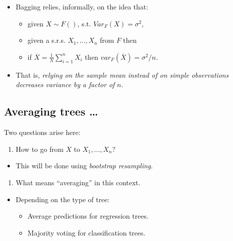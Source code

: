 \documentclass[
  letterpaper,
  DIV=11,
  numbers=noendperiod]{scrartcl}
\providecommand{\tightlist}{%
  \setlength{\itemsep}{0pt}\setlength{\parskip}{0pt}}\usepackage{longtable,booktabs,array}
\begin{document}
\begin{itemize}
\tightlist
\item
  Bagging relies, informally, on the idea that:

  \begin{itemize}
  \tightlist
  \item
    given \(X\sim F()\), s.t. \(Var_F(X)=\sigma^2\),
  \item
    given a s.r.s. \(X_1, ..., X_n\) from \(F\) then
  \item
    if \(\overline{X}=\frac{1}{N}\sum_{i=1}^n X_i\) then
    \(var_F(\overline{X})=\sigma^2/n\).
  \end{itemize}
\item
  That is, \emph{relying on the sample mean instead of on simple
  observations decreases variance by a factor of \(n\)}.
\end{itemize}

\hypertarget{averaging-trees}{%
\subsection{Averaging trees \ldots{}}\label{averaging-trees}}

Two questions arise here:

\begin{enumerate}
\def\labelenumi{\arabic{enumi}.}
\tightlist
\item
  How to go from \(X\) to \(X_1, ..., X_n\)?
\end{enumerate}

\begin{itemize}
\tightlist
\item
  This will be done using \emph{bootstrap resampling}.
\end{itemize}

\begin{enumerate}
\def\labelenumi{\arabic{enumi}.}
\setcounter{enumi}{1}
\tightlist
\item
  What means ``averaging'' in this context.
\end{enumerate}

\begin{itemize}
\tightlist
\item
  Depending on the type of tree:

  \begin{itemize}
  \tightlist
  \item
    Average predictions for regression trees.
  \item
    Majority voting for classification trees.
  \end{itemize}
\end{itemize}
\end{document}
